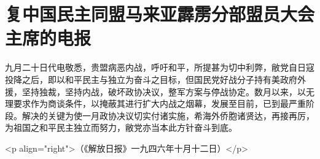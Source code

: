\section[复中国民主同盟马来亚霹雳分部盟员大会主席的电报（一九四六年十月八日）]{复中国民主同盟马来亚霹雳分部盟员大会主席的电报}


九月二十日代电敬悉，贵盟病恶内战，呼吁和平，所提甚为切中利弊，敝党自日寇投降之后，即以和平民主与独立为奋斗之目标，但国民党好战分子持有美政府外援，坚持独裁，坚持内战，破坏政协决议，整军方案与停战协定。数月以来，以无理要求作为商谈条件，以掩蔽其进行扩大内战之烟幕，发展至目前，已到最严重阶段。解决的关键为使一月政协决议切实付诸实施，希海外侨胞诸贤达，再接再厉，为祖国之和平民主独立而努力，敝党亦当本此方针奋斗到底。

<p align="right">（《解放日报》一九四六年十月十二日）</p>

